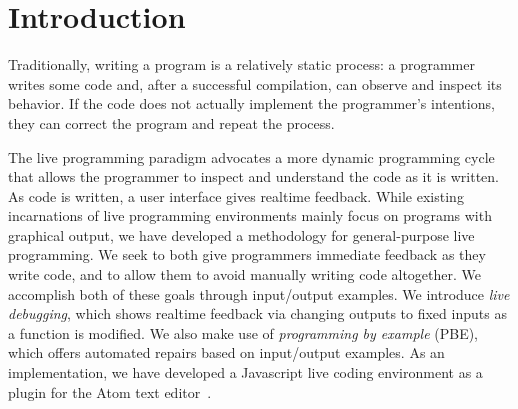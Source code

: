 \section{Introduction}
\label{sec:intro}


Traditionally, writing a program is a relatively static process: a programmer writes some code and, after a successful compilation, can observe and inspect its behavior. If the code does not actually implement the programmer's intentions, they can correct the program and repeat the process.

The live programming paradigm advocates a more dynamic programming cycle that allows the programmer to inspect and understand the code as it is written. As code is written, a user interface gives realtime feedback.  While existing incarnations of live programming environments mainly focus on programs with graphical output, we have developed a methodology for general-purpose live programming.
We seek to both give programmers immediate feedback as they write code,
and to allow them to avoid manually writing code altogether.
We accomplish both of these goals through input/output examples.
We introduce \textit{live debugging}, which shows realtime feedback via changing outputs to fixed inputs as a function is modified. We also make use of \textit{programming by example} (PBE), which offers automated repairs based on input/output examples. 
As an implementation, we have developed a Javascript live coding environment as a plugin for the Atom text editor~\cite{Atom}.



